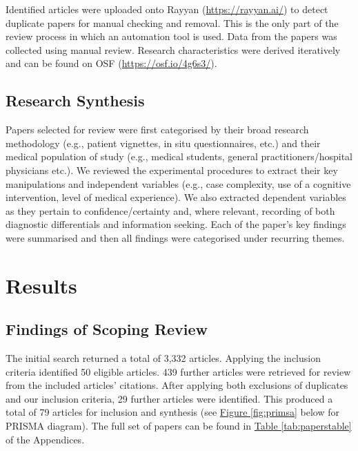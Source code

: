 \documentclass[a4paper, nobind]{templates/ociamthesis}
\begin{document}
Identified articles were uploaded onto Rayyan (\url{https://rayyan.ai/}) to detect duplicate papers for manual checking and removal. This is the only part of the review process in which an automation tool is used. Data from the papers was collected using manual review. Research characteristics were derived iteratively and can be found on OSF (\url{https://osf.io/4g6s3/}).

\subsection{Research Synthesis}\label{research-synthesis}

Papers selected for review were first categorised by their broad research methodology (e.g., patient vignettes, in situ questionnaires, etc.) and their medical population of study (e.g., medical students, general practitioners/hospital physicians etc.). We reviewed the experimental procedures to extract their key manipulations and independent variables (e.g., case complexity, use of a cognitive intervention, level of medical experience). We also extracted dependent variables as they pertain to confidence/certainty and, where relevant, recording of both diagnostic differentials and information seeking. Each of the paper's key findings were summarised and then all findings were categorised under recurring themes.

\section{Results}\label{results}

\subsection{Findings of Scoping Review}\label{findings-of-scoping-review}

The initial search returned a total of 3,332 articles. Applying the inclusion criteria identified 50 eligible articles. 439 further articles were retrieved for review from the included articles' citations. After applying both exclusions of duplicates and our inclusion criteria, 29 further articles were identified. This produced a total of 79 articles for inclusion and synthesis (see \hyperref[fig:primsa]{Figure \ref{fig:primsa}} below for PRISMA diagram). The full set of papers can be found in \hyperref[tab:paperstable]{Table \ref{tab:paperstable}} of the Appendices.

\newpage
\end{document}
